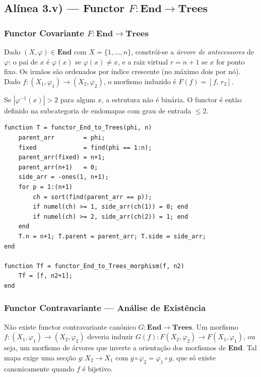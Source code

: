 \subsection{Alínea 3.v) --- Functor $F: \mathbf{End} \to \mathbf{Trees}$}
\label{subsec:functor-end-trees}

\subsubsection{Functor Covariante $F: \mathbf{End} \to \mathbf{Trees}$}

\begin{definition}
Dado $(X,\varphi) \in \mathbf{End}$ com $X=\{1,\ldots,n\}$, constrói-se a \emph{árvore de antecessores} de $\varphi$: o pai de $x$ é $\varphi(x)$ se $\varphi(x) \neq x$, e a raiz virtual $r=n{+}1$ se $x$ for ponto fixo. Os irmãos são ordenados por índice crescente (no máximo dois por nó). Dado $f: (X_1,\varphi_1) \to (X_2,\varphi_2)$, o morfismo induzido é $F(f) = [f,\,r_2]$.
\end{definition}

\begin{remark}
Se $|\varphi^{-1}(x)| > 2$ para algum $x$, a estrutura não é binária. O functor é então definido na subcategoria de endomapas com grau de entrada $\leq 2$.
\end{remark}

\begin{lstlisting}[style=matlab, caption={Functor covariante $F: \mathbf{End} \to \mathbf{Trees}$}]
function T = functor_End_to_Trees(phi, n)
    parent_arr        = phi;
    fixed             = find(phi == 1:n);
    parent_arr(fixed) = n+1;
    parent_arr(n+1)   = 0;
    side_arr = -ones(1, n+1);
    for p = 1:(n+1)
        ch = sort(find(parent_arr == p));
        if numel(ch) >= 1, side_arr(ch(1)) = 0; end
        if numel(ch) >= 2, side_arr(ch(2)) = 1; end
    end
    T.n = n+1; T.parent = parent_arr; T.side = side_arr;
end

function Tf = functor_End_to_Trees_morphism(f, n2)
    Tf = [f, n2+1];
end
\end{lstlisting}

\subsubsection{Functor Contravariante --- Análise de Existência}

\begin{proposition}
Não existe functor contravariante canónico $G: \mathbf{End} \to \mathbf{Trees}$. Um morfismo $f: (X_1,\varphi_1) \to (X_2,\varphi_2)$ deveria induzir $G(f): F(X_2,\varphi_2) \to F(X_1,\varphi_1)$, ou seja, um morfismo de árvores que inverte a orientação dos morfismos de \textbf{End}. Tal mapa exige uma secção $g: X_2 \to X_1$ com $g \circ \varphi_2 = \varphi_1 \circ g$, que só existe canonicamente quando $f$ é bijetivo.
\end{proposition}

